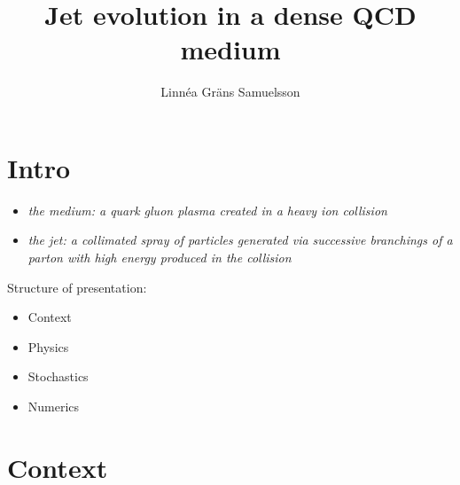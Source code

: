 \documentclass[pstricks,mathserif]{beamer}
\title{Jet evolution in a dense QCD medium}
\author{Linnéa Gräns Samuelsson}
\institute %
{
  Internship at CEA Saclay\\
  Supervisors: Edmond Iancu and Gregory Soyez
}
\begin{document}
\frame{\titlepage}


\section{Intro}

\begin{frame}


\endminipage\hfill
{}
\begin{itemize}
\item \emph{the medium: a quark gluon plasma created in a heavy ion collision}
\item \emph{the jet: a collimated spray of particles generated via successive branchings of a parton with high energy produced in the collision}
\end{itemize}
\endminipage\hfill


\vspace*{1cm}


Structure of presentation:

\begin{itemize}
\item Context
\item Physics
\item Stochastics
\item Numerics
\end{itemize}

\vspace*{1cm}

\end{frame}

\section{Context}
\end{document}

